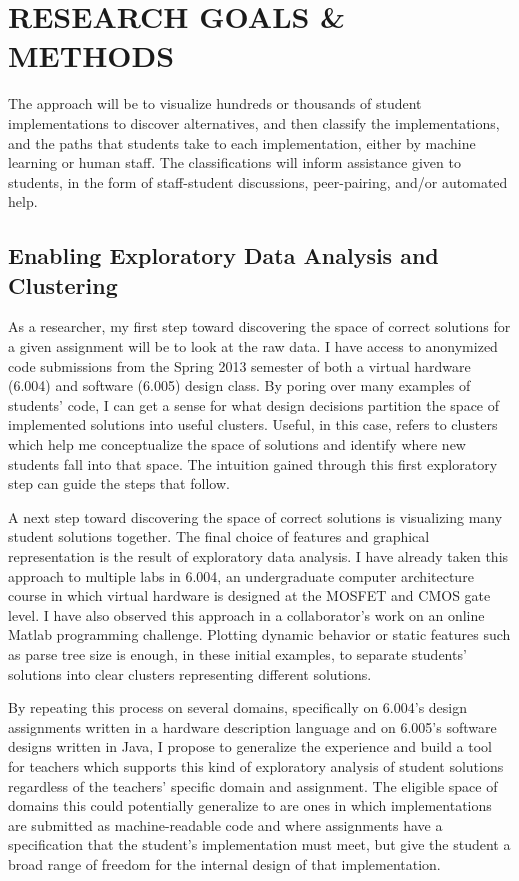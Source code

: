 \documentclass[12pt]{article}
\begin{document}
\section{RESEARCH GOALS \& METHODS}

The approach will be to visualize hundreds or thousands of student implementations to discover alternatives, and then classify the implementations, and the paths that students take to each implementation, either by machine learning or human staff. The classifications will inform assistance given to students, in the form of staff-student discussions, peer-pairing, and/or automated help.

\subsection{Enabling Exploratory Data Analysis and Clustering}

As a researcher, my first step toward discovering the space of correct solutions for a given assignment will be to look at the raw data. I have access to anonymized code submissions from the Spring 2013 semester of both a virtual hardware (6.004) and software (6.005) design class. By poring over many examples of students' code, I can get a sense for what design decisions partition the space of implemented solutions into useful clusters. Useful, in this case, refers to clusters which help me conceptualize the space of solutions and identify where new students fall into that space. The intuition gained through this first exploratory step can guide the steps that follow.

A next step toward discovering the space of correct solutions is visualizing many student solutions together. The final choice of features and graphical representation is the result of exploratory data analysis. I have already taken this approach to multiple labs in 6.004, an undergraduate computer architecture course in which virtual hardware is designed at the MOSFET and CMOS gate level. I have also observed this approach in a collaborator's work on an online Matlab programming challenge. Plotting dynamic behavior or static features such as parse tree size is enough, in these initial examples, to separate students' solutions into clear clusters representing different solutions.

By repeating this process on several domains, specifically on 6.004's design assignments written in a hardware description language and on 6.005's software designs written in Java, I propose to generalize the experience and build a tool for teachers which supports this kind of exploratory analysis of student solutions regardless of the teachers' specific domain and assignment. The eligible space of domains this could potentially generalize to are ones in which implementations are submitted as machine-readable code and where assignments have a specification that the student's implementation must meet, but give the student a broad range of freedom for the internal design of that implementation.
\end{document}
